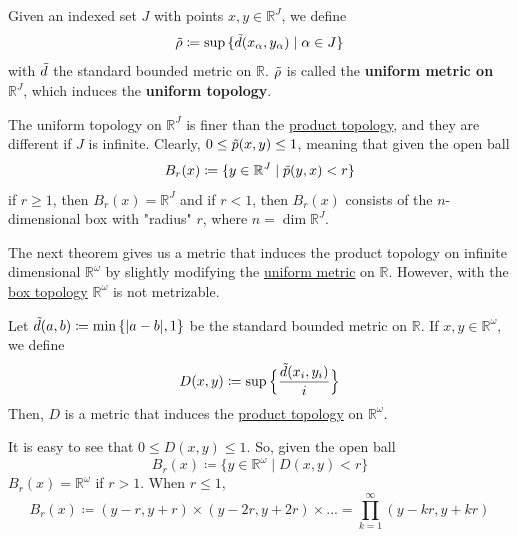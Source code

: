   \begin{definition}
    \label{def:uniform-metric}
    Given an indexed set $J$ with points $x, y \in \mathbb{R}^J$, we define
    \begin{equation}
      \Tilde{\rho} \coloneqq \sup{\{\Tilde{d}(x_\alpha, y_\alpha)\;|\; \alpha \in J\}}
    \end{equation}
    with $\Tilde{d}$ the standard bounded metric on $\mathbb{R}$. $\Tilde{\rho}$ is called the \textbf{uniform metric on $\mathbb{R}^J$}, which induces the \textbf{uniform topology}. 
  \end{definition}

  The uniform topology on $\mathbb{R}^J$ is finer than the \hyperref[def:product-topology]{product topology}, and they are different if $J$ is infinite. Clearly, $0 \leq \Tilde{p} (x, y) \leq 1$, meaning that given the open ball
  \begin{equation}
    B_r (x) \coloneqq \{y \in \mathbb{R}^J \;|\; \Tilde{p}(y, x) < r\}
  \end{equation}
  if $r \geq 1$, then $B_r (x) = \mathbb{R}^J$ and if $r<1$, then $B_r (x)$ consists of the $n$-dimensional box with "radius" $r$, where $n = \dim{\mathbb{R}^J}$. 


  The next theorem gives us a metric that induces the product topology on infinite dimensional $\mathbb{R}^\omega$ by slightly modifying the \hyperref[def:uniform-metric]{uniform metric} on $\mathbb{R}$. However, with the \hyperref[def:box-topology]{box topology} $\mathbb{R}^\omega$ is not metrizable. 

  \begin{theorem}
    \label{thm:the-standard-bounded-metric}
    Let $\Tilde{d} (a, b) \coloneqq \min{\{|a-b|, 1\}}$ be the standard bounded metric on $\mathbb{R}$. If $x, y \in \mathbb{R}^\omega$, we define
    \begin{equation}
      D(x, y) \coloneqq \sup{\Big\{ \frac{\Tilde{d}(x_i, y_i)}{i}\Big\}}
    \end{equation}
    Then, $D$ is a metric that induces the \hyperref[def:product-topology]{product topology} on $\mathbb{R}^\omega$. 
  \end{theorem}
  
  It is easy to see that $0 \leq D(x, y) \leq 1$. So, given the open ball
  \begin{equation}
    B_r (x) \coloneqq \{y \in \mathbb{R}^\omega \; | \; D(x, y) < r\}
  \end{equation}
  $B_r (x) = \mathbb{R}^\omega$ if $r > 1$. When $r \leq 1$, 
  \begin{equation}
    B_r (x) \coloneqq (y-r, y+r) \times (y-2r, y+2r) \times ... = \prod_{k=1}^\infty (y - k r , y + k r)
  \end{equation}

